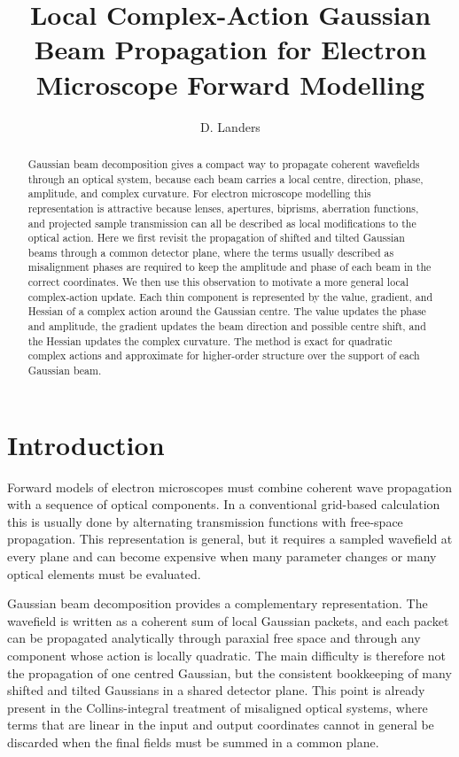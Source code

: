 \documentclass{article}
\title{Local Complex-Action Gaussian Beam Propagation for Electron Microscope Forward Modelling}
\author{D. Landers}
\begin{document}
\maketitle

\begin{abstract}
Gaussian beam decomposition gives a compact way to propagate coherent wavefields through an optical system, because each beam carries a local centre, direction, phase, amplitude, and complex curvature. 
For electron microscope modelling this representation is attractive because lenses, apertures, biprisms, aberration functions, and projected sample transmission can all be described as local modifications to the optical action. 
Here we first revisit the propagation of shifted and tilted Gaussian beams through a common detector plane, where the terms usually described as misalignment phases are required to keep the amplitude and phase of each beam in the correct coordinates. 
We then use this observation to motivate a more general local complex-action update. 
Each thin component is represented by the value, gradient, and Hessian of a complex action around the Gaussian centre. 
The value updates the phase and amplitude, the gradient updates the beam direction and possible centre shift, and the Hessian updates the complex curvature. 
The method is exact for quadratic complex actions and approximate for higher-order structure over the support of each Gaussian beam.
\end{abstract}

\section{Introduction}

Forward models of electron microscopes must combine coherent wave propagation with a sequence of optical components. 
In a conventional grid-based calculation this is usually done by alternating transmission functions with free-space propagation. 
This representation is general, but it requires a sampled wavefield at every plane and can become expensive when many parameter changes or many optical elements must be evaluated.

Gaussian beam decomposition provides a complementary representation. 
The wavefield is written as a coherent sum of local Gaussian packets, and each packet can be propagated analytically through paraxial free space and through any component whose action is locally quadratic. 
The main difficulty is therefore not the propagation of one centred Gaussian, but the consistent bookkeeping of many shifted and tilted Gaussians in a shared detector plane. 
This point is already present in the Collins-integral treatment of misaligned optical systems, where terms that are linear in the input and output coordinates cannot in general be discarded when the final fields must be summed in a common plane.
\end{document}

